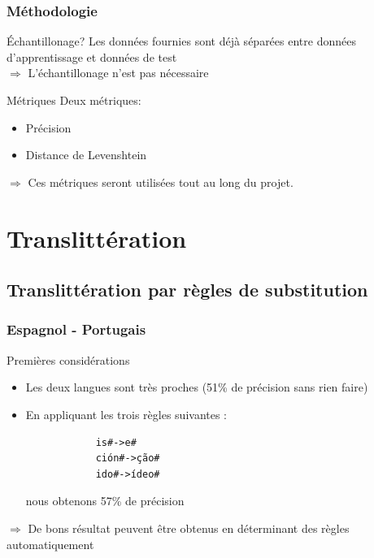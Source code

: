 \documentclass{beamer}
\begin{document}
\begin{frame}
\frametitle{Méthodologie}

	\begin{block}{Échantillonage?}
	Les données fournies sont déjà séparées entre données d'apprentissage et données de test\\
	$\Longrightarrow$ L'échantillonage n'est pas nécessaire
	\end{block}

	\begin{block}{Métriques}
	Deux métriques:
		\begin{itemize}
            \item Précision
            \item Distance de Levenshtein
		\end{itemize}		
	\end{block}
	
	\begin{alertblock}{}
	$\Longrightarrow$ Ces métriques seront utilisées tout au long du projet.
	\end{alertblock}	
	
\end{frame}

\section{Translittération}


\begin{frame}
\end{frame}





\subsection{Translittération par règles de substitution}

\begin{frame}[fragile]
	\frametitle{Espagnol - Portugais}

	\begin{block}{Premières considérations}
		\begin{itemize}
		\item Les deux langues sont très proches (51\% de précision sans rien faire)
		\item En appliquant les trois règles suivantes : {\scriptsize \begin{verbatim}
			is#->e#
			ción#->ção#
			ido#->ídeo#
			\end{verbatim}}
			nous obtenons 57\% de précision
		\end{itemize}
	\end{block}

	\begin{alertblock}{}
	$\Longrightarrow$ De bons résultat peuvent être obtenus en déterminant des règles automatiquement 
	\end{alertblock}
\end{frame}
\end{document}

